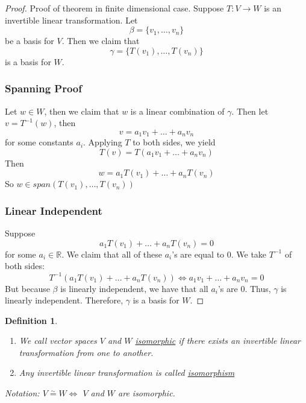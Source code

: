 \documentclass{article}
\newtheorem{definition}[theorem]{Definition}
\newtheorem{one minute paper}[theorem]{One Minute Paper}
\begin{document}
\begin{proof}
    Proof of theorem in finite dimensional case. Suppose $T: V \rightarrow W$ is an invertible linear transformation. Let 
    \begin{equation}
        \beta = \{v_1, \dots, v_n\}
    \end{equation} 
    be a basis for $V$. Then we claim that 
    \begin{equation}
        \gamma = \{T(v_1), \dots, T(v_n)\}
    \end{equation}
    is a basis for $W$. 
    \subsubsection*{Spanning Proof}
    Let $w \in W$, then we claim that $w$ is a linear combination of $\gamma$. Then let $v = T^{-1}(w)$, then 
    \begin{equation}
        v = a_1v_1 + \dots + a_nv_n
    \end{equation}
    for some constants $a_i$. Applying $T$ to both sides, we yield
    \begin{equation}
        T(v) = T(a_1v_1 + \dots + a_nv_n)
    \end{equation}
    Then 
    \begin{equation}
        w = a_1T(v_1) + \dots + a_nT(v_n)
    \end{equation}
    So $w \in span(T(v_1), \dots, T(v_n))$
    \subsubsection*{Linear Independent}
    Suppose 
    \begin{equation}
        a_1T(v_1) + \dots + a_nT(v_n) = 0
    \end{equation}
    for some $a_i \in \mathbb{R}$. We claim that all of these $a_i$'s are equal to 0. We take $T^{-1}$ of both sides:
    \begin{equation}
        T^{-1}(a_1T(v_1) + \dots + a_nT(v_n)) \iff a_1v_1 + \dots + a_nv_n = 0
    \end{equation}
    But because $\beta$ is linearly independent, we have that all $a_i$'s are 0. Thus, $\gamma$ is linearly independent. Therefore, $\gamma$ is a basis for $W$. 
\end{proof}

\begin{definition}
    \begin{enumerate}
        \item We call vector spaces $V$ and $W$ \underline{isomorphic} if there exists an invertible linear transformation from one to another. 
        \item Any invertible linear transformation is called \underline{isomorphism}
    \end{enumerate}
    Notation: $V \overset{\sim}{=} W \iff$ $V$ and $W$ are isomorphic.  
\end{definition}
\end{document}
